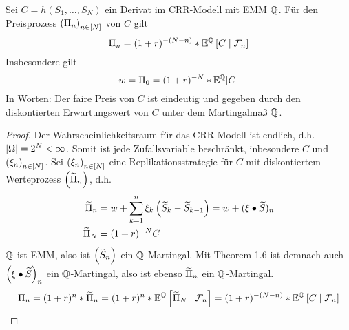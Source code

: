 \begin{theorem}
	\label{theorem: 2.7}
	Sei $C= h(S_1, \dots, S_N)$ ein Derivat im CRR-Modell mit EMM $\mathbb{Q}$. Für den Preisprozess $\left( \Pi_n \right)_{n \in [N]}$ von $C$ gilt
	\begin{equation*}
		\Pi_n = (1+r)^{-(N-n)} * \mathbb{E}^{\mathbb{Q}}\left[ C \mid \mathcal{F}_n \right]
	\end{equation*}
	Insbesondere gilt
	\begin{equation*}
		w = \Pi_0 = (1+r)^{-N} * \mathbb{E}^{\mathbb{Q}}[C]
	\end{equation*}
	In Worten: Der faire Preis von $C$ ist eindeutig und gegeben durch den diskontierten Erwartungswert von $C$ unter dem Martingalmaß $\mathbb{Q}$.
\end{theorem}
\begin{proof}
	Der Wahrscheinlichkeitsraum für das CRR-Modell ist endlich, d.h. $\left| \Omega \right| = 2^N < \infty$. Somit ist jede Zufallsvariable beschränkt, inbesondere $C$ und $\left( \xi_n \right)_{n \in [N]}$. Sei $\left( \xi_n \right)_{n \in [N]}$ eine Replikationsstrategie für $C$ mit diskontiertem Werteprozess $\left( \widetilde{\Pi}_n \right)_{}$, d.h.
	\begin{equation*}
		\begin{aligned}
			\widetilde{\Pi}_n &= w + \sum_{k=1}^n \xi_k \left( \widetilde{S}_k - \widetilde{S}_{k-1} \right) = w + (\xi \bullet \widetilde{S})_n \\
			\widetilde{\Pi}_N &= (1+r)^{-N} C
		\end{aligned}
	\end{equation*}
	$\mathbb{Q}$ ist EMM, also ist $\left( \widetilde{S}_n \right)_{}$ ein $\mathbb{Q}$-Martingal. Mit Theorem 1.6 ist demnach auch $\left( \xi \bullet \widetilde{S} \right)_{n}$ ein $\mathbb{Q}$-Martingal, also ist ebenso $\widetilde{\Pi}_n$ ein $\mathbb{Q}$-Martingal.
	\begin{equation*}
		\Pi_n = (1+r)^{n} * \widetilde{\Pi}_n = (1+r)^n * \mathbb{E}^{\mathbb{Q}} \left[ \widetilde{\Pi}_N \mid \mathcal{F}_n \right] = (1+r)^{-(N-n)} * \mathbb{E}^{\mathbb{Q}}\left[ C \mid \mathcal{F}_n \right]
	\end{equation*}
\end{proof}

